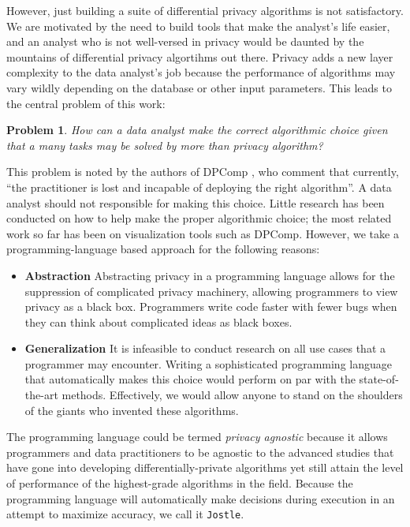 \documentclass[11pt]{article}
\newtheorem{problem}{Problem}
\newcommand{\Jostle}{\texttt{Jostle}}
\begin{document}
However, just building a suite of differential privacy algorithms is not satisfactory. We are motivated by the need to build tools that make the analyst's life easier, and an analyst who is not well-versed in privacy would be daunted by the mountains of differential privacy algortihms out there. Privacy adds a new layer complexity to the data analyst's job because the performance of algorithms may vary wildly depending on the database or other input parameters. This leads to the central problem of this work: 
\begin{problem}\label{prob:1}
How can a data analyst make the correct algorithmic choice given that a many tasks may be solved by more than privacy algorithm?
\end{problem}
This problem is noted by the authors of DPComp \cite{Hay:2016}, who comment that currently, ``the practitioner is lost and incapable of deploying the right algorithm''. A data analyst should not responsible for making this choice. Little research has been conducted on how to help make the proper algorithmic choice; the most related work so far has been on visualization tools such as DPComp. However, we take a programming-language based approach for the following reasons:

\begin{itemize}
\item \textbf{Abstraction} Abstracting privacy in a programming language allows for the suppression of complicated privacy machinery, allowing programmers to view privacy as a black box. Programmers write code faster with fewer bugs when they can think about complicated ideas as black boxes.
\item \textbf{Generalization} It is infeasible to conduct research on all use cases that a programmer may encounter. Writing a sophisticated programming language that automatically makes this choice would perform on par with the state-of-the-art methods. Effectively, we would allow anyone to stand on the shoulders of the giants who invented these algorithms.
\end{itemize}

The programming language could be termed \emph{privacy agnostic} because it allows programmers and data practitioners to be agnostic to the advanced studies that have gone into developing differentially-private algorithms yet still attain the level of performance of the highest-grade algorithms in the field. Because the programming language will automatically make decisions during execution in an attempt to maximize accuracy, we call it \Jostle{}.
\end{document}
